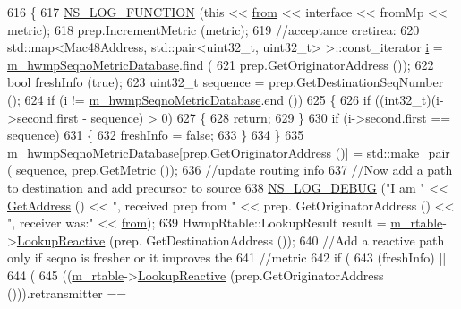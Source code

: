 \begin{DoxyCode}
616 \{
617   \hyperlink{log-macros-disabled_8h_a90b90d5bad1f39cb1b64923ea94c0761}{NS\_LOG\_FUNCTION} (\textcolor{keyword}{this} << \hyperlink{lte__amc_8m_a1b4c81ff74eb1a626b5ade44c81004b3}{from} << interface << fromMp << metric);
618   prep.IncrementMetric (metric);
619   \textcolor{comment}{//acceptance cretirea:}
620   std::map<Mac48Address, std::pair<uint32\_t, uint32\_t> >::const\_iterator \hyperlink{bernuolliDistribution_8m_a6f6ccfcf58b31cb6412107d9d5281426}{i} = 
      \hyperlink{classns3_1_1dot11s_1_1HwmpProtocol_afcff65dd692f7524ea04f46d2cfc7990}{m\_hwmpSeqnoMetricDatabase}.find (
621       prep.GetOriginatorAddress ());
622   \textcolor{keywordtype}{bool} freshInfo (\textcolor{keyword}{true});
623   uint32\_t sequence = prep.GetDestinationSeqNumber ();
624   \textcolor{keywordflow}{if} (i != \hyperlink{classns3_1_1dot11s_1_1HwmpProtocol_afcff65dd692f7524ea04f46d2cfc7990}{m\_hwmpSeqnoMetricDatabase}.end ())
625     \{
626       \textcolor{keywordflow}{if} ((int32\_t)(i->second.first - sequence) > 0)
627         \{
628           \textcolor{keywordflow}{return};
629         \}
630       \textcolor{keywordflow}{if} (i->second.first == sequence)
631         \{
632           freshInfo = \textcolor{keyword}{false};
633         \}
634     \}
635   \hyperlink{classns3_1_1dot11s_1_1HwmpProtocol_afcff65dd692f7524ea04f46d2cfc7990}{m\_hwmpSeqnoMetricDatabase}[prep.GetOriginatorAddress ()] = std::make\_pair (
      sequence, prep.GetMetric ());
636   \textcolor{comment}{//update routing info}
637   \textcolor{comment}{//Now add a path to destination and add precursor to source}
638   \hyperlink{group__logging_ga413f1886406d49f59a6a0a89b77b4d0a}{NS\_LOG\_DEBUG} (\textcolor{stringliteral}{"I am "} << \hyperlink{classns3_1_1dot11s_1_1HwmpProtocol_ab8b2c6d98ae278406f543e25feca8ccc}{GetAddress} () << \textcolor{stringliteral}{", received prep from "} << prep.
      GetOriginatorAddress () << \textcolor{stringliteral}{", receiver was:"} << \hyperlink{lte__amc_8m_a1b4c81ff74eb1a626b5ade44c81004b3}{from});
639   HwmpRtable::LookupResult result = \hyperlink{classns3_1_1dot11s_1_1HwmpProtocol_a12fda0e3e5a400888c8ba1a87c1a7216}{m\_rtable}->\hyperlink{classns3_1_1dot11s_1_1HwmpRtable_a41a44ed94c1ed4d798f3278ba8db0f1f}{LookupReactive} (prep.
      GetDestinationAddress ());
640   \textcolor{comment}{//Add a reactive path only if seqno is fresher or it improves the}
641   \textcolor{comment}{//metric}
642   \textcolor{keywordflow}{if} (
643     (freshInfo) ||
644     (
645       ((\hyperlink{classns3_1_1dot11s_1_1HwmpProtocol_a12fda0e3e5a400888c8ba1a87c1a7216}{m\_rtable}->\hyperlink{classns3_1_1dot11s_1_1HwmpRtable_a41a44ed94c1ed4d798f3278ba8db0f1f}{LookupReactive} (prep.GetOriginatorAddress ())).retransmitter == 

\end{DoxyCode}

